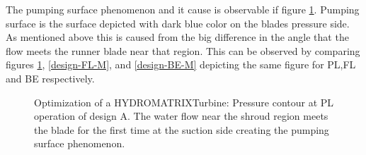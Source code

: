 The pumping surface phenomenon and it cause is observable if figure \ref{design-PL-M}. Pumping surface is the surface depicted with dark blue color on the blades pressure side. As mentioned above this is caused from the big difference in the angle that the flow meets the runner blade near that region. This can be observed by comparing figures \ref{design-PL-M}, \ref{design-FL-M}, and \ref{design-BE-M} depicting the same figure for PL,FL and BE respectively.   

\begin{figure}[h!]
\begin{minipage}[b]{1\linewidth}
 \centering
\end{minipage}
\caption{Optimization of a HYDROMATRIX\circledR Turbine: Pressure contour at PL operation of design A. The water flow near the shroud region meets the blade for the first time at the suction side creating the pumping surface phenomenon. }
\label{design-PL-M}
\end{figure}


